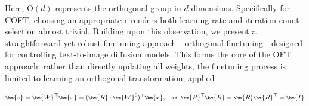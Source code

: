 {Here, $\text{O}(d)$ represents the orthogonal group in $d$ dimensions. Specifically for COFT, choosing an appropriate $\epsilon$ renders both learning rate and iteration count selection almost trivial. Building upon this observation, we present a straightforward yet robust finetuning approach—orthogonal finetuning—designed for controlling text-to-image diffusion models. This forms the core of the OFT approach: rather than directly updating all weights, the finetuning process is limited to learning an orthogonal transformation, applied

\begin{equation}\label{eq:oft_general}
    \footnotesize
    \bm{z}=\bm{W}^\top\bm{x}=(\bm{R}\cdot\bm{W}^0)^\top\bm{x},~~~\text{s.t.}~\bm{R}^\top\bm{R}=\bm{R}\bm{R}^\top=\bm{I}
\end{equation}

}
